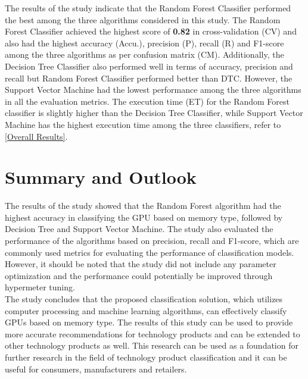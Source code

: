 \documentclass[conference]{IEEEtran}
\begin{document}
	The results of the study indicate that the Random Forest Classifier performed the best among the three algorithms considered in this study. The Random Forest Classifier achieved the highest score of \textbf{0.82} in cross-validation (CV) and also had the highest accuracy (Accu.), precision (P), recall (R) and F1-score among the three algorithms as per confusion matrix (CM). Additionally, the Decision Tree Classifier also performed well in terms of accuracy, precision and recall but Random Forest Classifier performed better than DTC. However, the Support Vector Machine had the lowest performance among the three algorithms in all the evaluation metrics. The execution time (ET) for the Random Forest classifier is slightly higher than the Decision Tree Classifier, while Support Vector Machine has the highest execution time among the three classifiers, refer to \figurename{\ref{Overall Results}}.
\section{Summary and Outlook}
	The results of the study showed that the Random Forest algorithm had the highest accuracy in classifying the GPU based on memory type, followed by Decision Tree and Support Vector Machine. The study also evaluated the performance of the algorithms based on precision, recall and F1-score, which are commonly used metrics for evaluating the performance of classification models. However, it should be noted that the study did not include any parameter optimization and the performance could potentially be improved through hypermeter tuning.\\
	
	The study concludes that the proposed classification solution, which utilizes computer processing and machine learning algorithms, can effectively classify GPUs based on memory type. The results of this study can be used to provide more accurate recommendations for technology products and can be extended to other technology products as well. This research can be used as a foundation for further research in the field of technology product classification and it can be useful for consumers, manufacturers and retailers. 
	
\end{document}
